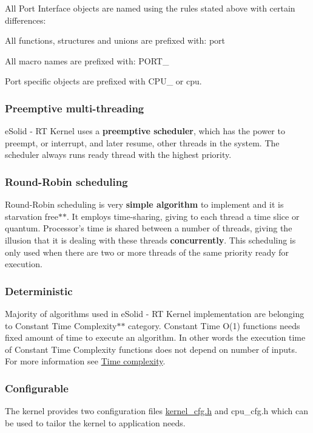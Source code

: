 All Port Interface objects are named using the rules stated above with certain differences\-:
\begin{DoxyItemize}
\item All functions, structures and unions are prefixed with\-: {\ttfamily port}
\item All macro names are prefixed with\-: {\ttfamily P\-O\-R\-T\-\_\-}
\item Port specific objects are prefixed with {\ttfamily C\-P\-U\-\_\-} or {\ttfamily cpu}.
\end{DoxyItemize}\hypertarget{index_spec_preempt}{}\subsubsection{Preemptive multi-\/threading}\label{index_spec_preempt}
e\-Solid -\/ R\-T Kernel uses a {\bfseries preemptive scheduler}, which has the power to preempt, or interrupt, and later resume, other threads in the system. The scheduler always runs ready thread with the highest priority.\hypertarget{index_spec_rr}{}\subsubsection{Round-\/\-Robin scheduling}\label{index_spec_rr}
Round-\/\-Robin scheduling is very {\bfseries simple algorithm} to implement and it is starvation free$\ast$$\ast$. It employs time-\/sharing, giving to each thread a time slice or {\ttfamily quantum}. Processor's time is shared between a number of threads, giving the illusion that it is dealing with these threads {\bfseries concurrently}. This scheduling is only used when there are two or more threads of the same priority ready for execution.\hypertarget{index_spec_deterministic}{}\subsubsection{Deterministic}\label{index_spec_deterministic}
Majority of algorithms used in e\-Solid -\/ R\-T Kernel implementation are belonging to Constant Time Complexity$\ast$$\ast$ category. Constant Time {\ttfamily O(1)} functions needs fixed amount of time to execute an algorithm. In other words the execution time of Constant Time Complexity functions does not depend on number of inputs. For more information see \hyperlink{time_complexity}{Time complexity}.\hypertarget{index_spec_cfg}{}\subsubsection{Configurable}\label{index_spec_cfg}
The kernel provides two configuration files \hyperlink{kernel__cfg_8h}{kernel\-\_\-cfg.\-h} and cpu\-\_\-cfg.\-h which can be used to tailor the kernel to application needs.

